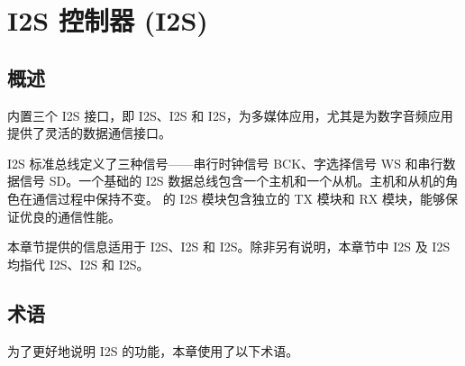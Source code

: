 \documentclass[main\_\_CN.tex]{subfiles}
\begin{document}

\ifglobal
\else
    {\let\clearpage\relax \listoftodos}
    {\let\clearpage\relax \listofdonetodos}
    \tableofcontents
\fi



\hypertarget{i2s}{}
\chapter{I2S 控制器 (I2S)}
\label{mod:i2s}

\section{概述}

\chipname{} 内置三个 I2S 接口，即 I2S、I2S 和 I2S，为多媒体应用，尤其是为数字音频应用提供了灵活的数据通信接口。

I2S 标准总线定义了三种信号——串行时钟信号 BCK、字选择信号 WS 和串行数据信号 SD。一个基础的 I2S 数据总线包含一个主机和一个从机。主机和从机的角色在通信过程中保持不变。\chipname{} 的 I2S 模块包含独立的 TX 模块和 RX 模块，能够保证优良的通信性能。

\begin{tiplisting}
本章节提供的信息适用于 I2S、I2S 和 I2S。除非另有说明，本章节中 I2S 及 I2S 均指代 I2S、I2S 和 I2S。
\end{tiplisting}
\vspace{-2em}

\section{术语}
\label{sec:i2s-term}

为了更好地说明 I2S 的功能，本章使用了以下术语。 
\end{document}
